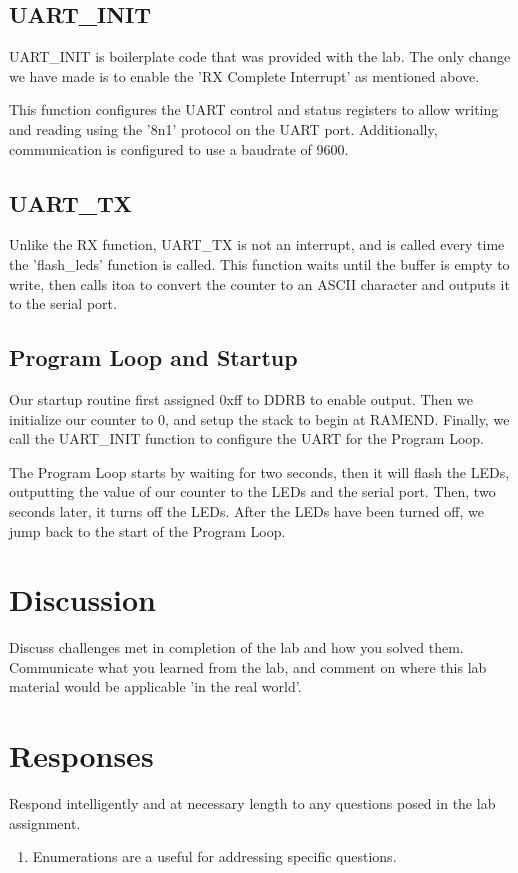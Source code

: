 \documentclass[letterpaper,11pt]{texMemo} %
\begin{document}
\subsection*{UART\_INIT}
UART_INIT is boilerplate code that was provided with the lab. The only change we have made is to enable the 'RX Complete Interrupt' as mentioned above.

This function configures the UART control and status registers to allow writing and reading using the '8n1' protocol on the UART port. Additionally, communication is configured to use a baudrate of 9600.

\subsection*{UART\_TX}
Unlike the RX function, UART\_TX is not an interrupt, and is called every time the 'flash\_leds' function is called. This function waits until the buffer is empty to write, then calls itoa to convert the counter to an ASCII character and outputs it to the serial port.

\subsection*{Program Loop and Startup}
Our startup routine first assigned 0xff to DDRB to enable output. Then we initialize our counter to 0, and setup the stack to begin at RAMEND. Finally, we call the UART\_INIT function to configure the UART for the Program Loop.

The Program Loop starts by waiting for two seconds, then it will flash the LEDs, outputting the value of our counter to the LEDs and the serial port. Then, two seconds later, it turns off the LEDs. After the LEDs have been turned off, we jump back to the start of the Program Loop.

\section*{Discussion}
Discuss challenges met in completion of the lab and how you solved them. Communicate what you learned from the lab, and comment on where this lab material would be applicable 'in the real world'. 

\section*{Responses}
Respond intelligently and at necessary length to any questions posed in the lab assignment.
\begin{enumerate}
\item Enumerations are a useful for addressing specific questions.
\end{enumerate} 
\end{document}
